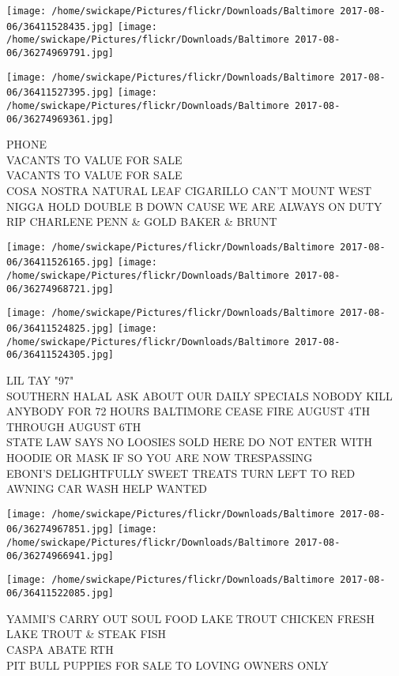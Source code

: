 \documentclass[10pt,letterpaper]{article}
\begin{document}
\texttt{[image: /home/swickape/Pictures/flickr/Downloads/Baltimore 2017-08-06/36411528435.jpg]}
\texttt{[image: /home/swickape/Pictures/flickr/Downloads/Baltimore 2017-08-06/36274969791.jpg]}

\texttt{[image: /home/swickape/Pictures/flickr/Downloads/Baltimore 2017-08-06/36411527395.jpg]}
\texttt{[image: /home/swickape/Pictures/flickr/Downloads/Baltimore 2017-08-06/36274969361.jpg]}

PHONE\\
VACANTS TO VALUE FOR SALE\\
VACANTS TO VALUE FOR SALE\\
COSA NOSTRA NATURAL LEAF CIGARILLO CAN'T MOUNT WEST NIGGA HOLD DOUBLE B DOWN CAUSE WE ARE ALWAYS ON DUTY RIP CHARLENE PENN \& GOLD BAKER \& BRUNT\\
\pagebreak

\texttt{[image: /home/swickape/Pictures/flickr/Downloads/Baltimore 2017-08-06/36411526165.jpg]}
\texttt{[image: /home/swickape/Pictures/flickr/Downloads/Baltimore 2017-08-06/36274968721.jpg]}

\texttt{[image: /home/swickape/Pictures/flickr/Downloads/Baltimore 2017-08-06/36411524825.jpg]}
\texttt{[image: /home/swickape/Pictures/flickr/Downloads/Baltimore 2017-08-06/36411524305.jpg]}

LIL TAY "97"\\
SOUTHERN HALAL ASK ABOUT OUR DAILY SPECIALS NOBODY KILL ANYBODY FOR 72 HOURS BALTIMORE CEASE FIRE AUGUST 4TH THROUGH AUGUST 6TH\\
STATE LAW SAYS NO LOOSIES SOLD HERE DO NOT ENTER WITH HOODIE OR MASK IF SO YOU ARE NOW TRESPASSING\\
EBONI'S DELIGHTFULLY SWEET TREATS TURN LEFT TO RED AWNING CAR WASH HELP WANTED\\
\pagebreak

\texttt{[image: /home/swickape/Pictures/flickr/Downloads/Baltimore 2017-08-06/36274967851.jpg]}
\texttt{[image: /home/swickape/Pictures/flickr/Downloads/Baltimore 2017-08-06/36274966941.jpg]}

\texttt{[image: /home/swickape/Pictures/flickr/Downloads/Baltimore 2017-08-06/36411522085.jpg]}

YAMMI'S CARRY OUT SOUL FOOD LAKE TROUT CHICKEN FRESH LAKE TROUT \& STEAK FISH\\
CASPA ABATE RTH\\
PIT BULL PUPPIES FOR SALE TO LOVING OWNERS ONLY\\
\pagebreak
\end{document}
